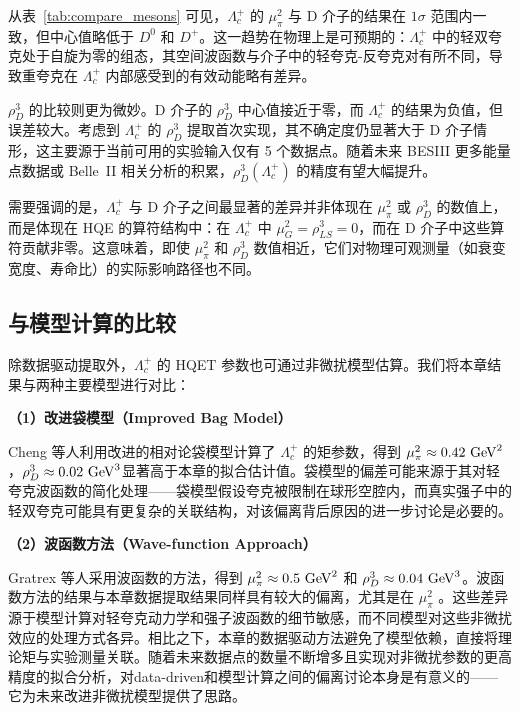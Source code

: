 从表~\ref{tab:compare_mesons} 可见，$\Lambda_c^+$ 的 $\mu_\pi^2$ 与 D 介子的结果在 $1\sigma$ 范围内一致，但中心值略低于 $D^0$ 和 $D^+$。这一趋势在物理上是可预期的：$\Lambda_c^+$ 中的轻双夸克处于自旋为零的组态，其空间波函数与介子中的轻夸克-反夸克对有所不同，导致重夸克在 $\Lambda_c^+$ 内部感受到的有效动能略有差异。

$\rho_D^3$ 的比较则更为微妙。D 介子的 $\rho_D^3$ 中心值接近于零，而 $\Lambda_c^+$ 的结果为负值，但误差较大。考虑到 $\Lambda_c^+$ 的 $\rho_D^3$ 提取首次实现，其不确定度仍显著大于 D 介子情形，这主要源于当前可用的实验输入仅有 5 个数据点。随着未来 BESIII 更多能量点数据或 Belle~II 相关分析的积累，$\rho_D^3(\Lambda_c^+)$ 的精度有望大幅提升。

需要强调的是，$\Lambda_c^+$ 与 D 介子之间最显著的差异并非体现在 $\mu_\pi^2$ 或 $\rho_D^3$ 的数值上，而是体现在 HQE 的算符结构中：在 $\Lambda_c^+$ 中 $\mu_G^2 = \rho_{LS}^3 = 0$，而在 D 介子中这些算符贡献非零。这意味着，即使 $\mu_\pi^2$ 和 $\rho_D^3$ 数值相近，它们对物理可观测量（如衰变宽度、寿命比）的实际影响路径也不同。

\subsection{与模型计算的比较}

除数据驱动提取外，$\Lambda_c^+$ 的 HQET 参数也可通过非微扰模型估算。我们将本章结果与两种主要模型进行对比：

\textbf{（1）改进袋模型（Improved Bag Model）}

Cheng 等人\cite{Cheng:2023jpz}利用改进的相对论袋模型计算了 $\Lambda_c^+$ 的矩参数，得到 $\mu_\pi^2 \approx 0.42~\mathrm{GeV}^2$，$\rho_D^3 \approx 0.02~\mathrm{GeV}^3$显著高于本章的拟合估计值。袋模型的偏差可能来源于其对轻夸克波函数的简化处理——袋模型假设夸克被限制在球形空腔内，而真实强子中的轻双夸克可能具有更复杂的关联结构，对该偏离背后原因的进一步讨论是必要的。

\textbf{（2）波函数方法（Wave-function Approach）}

Gratrex 等人\cite{Gratrex:2022xpm}采用波函数的方法，得到 $\mu_\pi^2 \approx 0.5~\mathrm{GeV}^2$ 和 $\rho_D^3 \approx 0.04~\mathrm{GeV}^3$。波函数方法的结果与本章数据提取结果同样具有较大的偏离，尤其是在 $\mu_\pi^2$ 。这些差异源于模型计算对轻夸克动力学和强子波函数的细节敏感，而不同模型对这些非微扰效应的处理方式各异。相比之下，本章的数据驱动方法避免了模型依赖，直接将理论矩与实验测量关联。随着未来数据点的数量不断增多且实现对非微扰参数的更高精度的拟合分析，对data-driven和模型计算之间的偏离讨论本身是有意义的——它为未来改进非微扰模型提供了思路。


